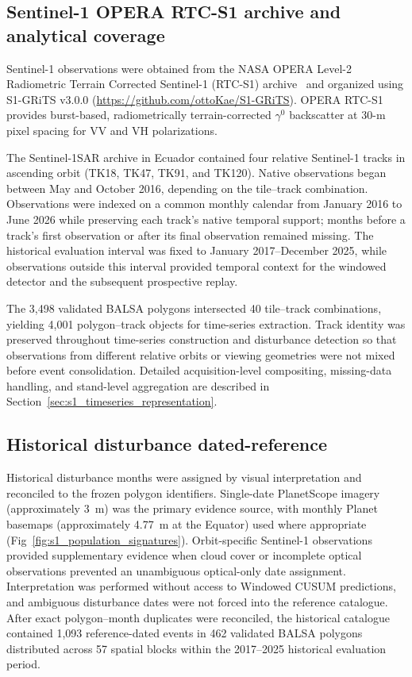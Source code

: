 \subsection{Sentinel-1 OPERA RTC-S1 archive and analytical coverage}
\label{sec:s1_archive}

Sentinel-1 observations were obtained from the NASA OPERA Level-2 Radiometric Terrain Corrected Sentinel-1 (RTC-S1) archive~\citep{shiroma2023OPERARTC,opera2023rtc} and organized using S1-GRiTS v3.0.0 (\url{https://github.com/ottoKae/S1-GRiTS}). OPERA RTC-S1 provides burst-based, radiometrically terrain-corrected $\gamma^{0}$ backscatter at 30-m pixel spacing for VV and VH polarizations.

The Sentinel-1SAR archive in Ecuador contained four relative Sentinel-1 tracks in ascending orbit (TK18, TK47, TK91, and TK120). Native observations began between May and October 2016, depending on the tile--track combination. Observations were indexed on a common monthly calendar from January 2016 to June 2026 while preserving each track's native temporal support; months before a track's first observation or after its final observation remained missing. The historical evaluation interval was fixed to January 2017--December 2025, while observations outside this interval provided temporal context for the windowed detector and the subsequent prospective replay.

The 3,498 validated BALSA polygons intersected 40 tile--track combinations, yielding 4,001 polygon--track objects for time-series extraction. Track identity was preserved throughout time-series construction and disturbance detection so that observations from different relative orbits or viewing geometries were not mixed before event consolidation. Detailed acquisition-level compositing, missing-data handling, and stand-level aggregation are described in Section~\ref{sec:s1_timeseries_representation}.


\subsection{Historical disturbance dated-reference}
\label{sec:historical_references}

Historical disturbance months were assigned by visual interpretation and reconciled to the frozen polygon identifiers. Single-date PlanetScope imagery (approximately 3~m) was the primary evidence source, with monthly Planet basemaps (approximately 4.77~m at the Equator) used where appropriate (Fig~\ref{fig:s1_population_signatures}). Orbit-specific Sentinel-1 observations provided supplementary evidence when cloud cover or incomplete optical observations prevented an unambiguous optical-only date assignment. Interpretation was performed without access to Windowed CUSUM predictions, and ambiguous disturbance dates were not forced into the reference catalogue. After exact polygon--month duplicates were reconciled, the historical catalogue contained 1,093 reference-dated events in 462 validated BALSA polygons distributed across 57 spatial blocks within the 2017--2025 historical evaluation period.

